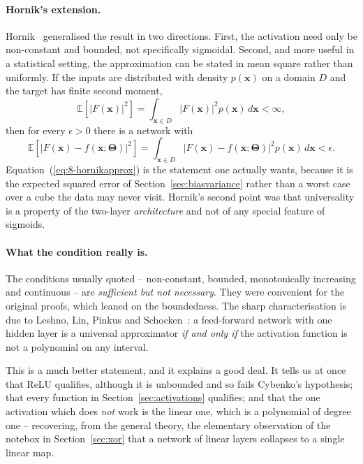 \paragraph{Hornik's extension.}
Hornik~\cite{hornik1991} generalised the result in two directions.  First, the
activation need only be non-constant and bounded, not specifically sigmoidal.
Second, and more useful in a statistical setting, the approximation can be
stated in mean square rather than uniformly.  If the inputs are distributed
with density $p(\bm{x})$ on a domain $D$ and the target has finite second
moment,
\begin{equation}
  \mathbb{E}\left[\left|F(\bm{x})\right|^{2}\right]
   = \int_{\bm{x}\in D}\left|F(\bm{x})\right|^{2}p(\bm{x})\,d\bm{x} < \infty,
  \label{eq:8-horniksecond}
\end{equation}
then for every $\epsilon>0$ there is a network with
\begin{equation}
  \mathbb{E}\left[\left|F(\bm{x})-f(\bm{x};\bm{\Theta})\right|^{2}\right]
   = \int_{\bm{x}\in D}
     \left|F(\bm{x})-f(\bm{x};\bm{\Theta})\right|^{2}p(\bm{x})\,d\bm{x}
   < \epsilon .
  \label{eq:8-hornikapprox}
\end{equation}
Equation~(\ref{eq:8-hornikapprox}) is the statement one actually wants, because
it is the expected squared error of Section~\ref{sec:biasvariance} rather than
a worst case over a cube the data may never visit.  Hornik's second point was
that universality is a property of the two-layer \emph{architecture} and not of
any special feature of sigmoids.

\paragraph{What the condition really is.}
The conditions usually quoted -- non-constant, bounded, monotonically
increasing and continuous -- are \emph{sufficient but not necessary}.  They
were convenient for the original proofs, which leaned on the boundedness.  The
sharp characterisation is due to Leshno, Lin, Pinkus and
Schocken~\cite{leshno1993}: a feed-forward network with one hidden layer is a
universal approximator \emph{if and only if} the activation function is not a
polynomial on any interval.

This is a much better statement, and it explains a good deal.  It tells us at
once that ReLU qualifies, although it is unbounded and so fails Cybenko's
hypothesis; that every function in Section~\ref{sec:activations} qualifies; and
that the one activation which does \emph{not} work is the linear one, which is
a polynomial of degree one -- recovering, from the general theory, the
elementary observation of the notebox in Section~\ref{sec:xor} that a network
of linear layers collapses to a single linear map.

